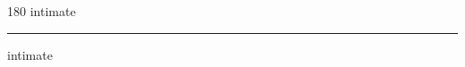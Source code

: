 
\begin{frame}
\begin{center}
\begin{turn}{180}
{\fontsize{2.5cm}{1em}\selectfont intimate}
\end{turn}
\vspace{1em}\par  
\hrule
\vspace{1em}\par  
{\fontsize{2.5cm}{1em}\selectfont intimate}
\end{center}
\end{frame}
